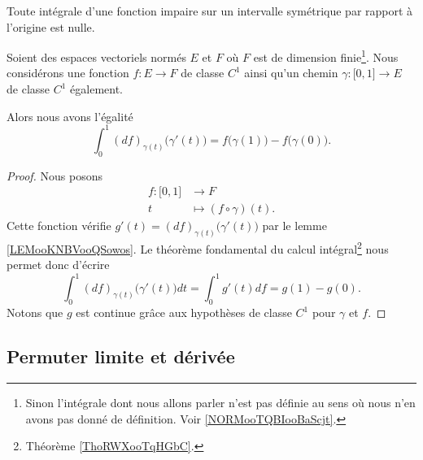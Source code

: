 \begin{remark}
	Toute intégrale d'une fonction impaire sur un intervalle symétrique par rapport à l'origine est nulle.
\end{remark}

\begin{proposition}      \label{PROPooJYIAooXLkbMx}
	Soient des espaces vectoriels normés \( E\) et \( F\) où \( F\) est de dimension finie\footnote{Sinon l'intégrale dont nous allons parler n'est pas définie au sens où nous n'en avons pas donné de définition. Voir \ref{NORMooTQBIooBaScjt}.}. Nous considérons une fonction \( f\colon E\to F\) de classe \( C^1\) ainsi qu'un chemin \( \gamma\colon \mathopen[ 0 , 1 \mathclose]\to E\) de classe \( C^1\) également.

	Alors nous avons l'égalité
	\begin{equation}
		\int_0^1(df)_{\gamma(t)}\big( \gamma'(t) \big)=f\big( \gamma(1) \big)-f\big( \gamma(0) \big).
	\end{equation}
\end{proposition}

\begin{proof}
	Nous posons
	\begin{equation}
		\begin{aligned}
			f\colon \mathopen[ 0 , 1 \mathclose] & \to F                      \\
			t                                    & \mapsto (f\circ\gamma)(t).
		\end{aligned}
	\end{equation}
	Cette fonction vérifie \( g'(t)=(df)_{\gamma(t)}\big( \gamma'(t) \big)\) par le lemme \ref{LEMooKNBVooQSowos}. Le théorème fondamental du calcul intégral\footnote{Théorème \ref{ThoRWXooTqHGbC}.} nous permet donc d'écrire
	\begin{equation}
		\int_0^1(df)_{\gamma(t)}\big( \gamma'(t) \big)dt=\int_0^1g'(t)df=g(1)-g(0).
	\end{equation}
	Notons que \( g\) est continue grâce aux hypothèses de classe \( C^1\) pour \( \gamma\) et \( f\).
\end{proof}

\subsection{Permuter limite et dérivée}


